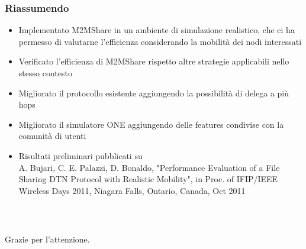\documentclass{beamer}
\begin{document}
%

\begin{frame}
\frametitle{Riassumendo}
\label{Riassumendo}
\begin{itemize}
\item Implementato M2MShare in un ambiente di simulazione realistico, che ci ha permesso di valutarne l'efficienza considerando la mobilità dei nodi interessati
\pause
\item Verificato l'efficienza di M2MShare rispetto altre strategie applicabili nello stesso contesto
\pause
\item Migliorato il protocollo esistente aggiungendo la possibilità di delega a più hops
\pause
\item Migliorato il simulatore ONE aggiungendo delle features condivise con la comunità di utenti
\pause
\item Risultati preliminari pubblicati su\\
A. Bujari, C. E. Palazzi, D. Bonaldo, "Performance Evaluation of a File Sharing DTN Protocol with Realistic Mobility", in Proc. of IFIP/IEEE Wireless Days 2011, Niagara
Falls, Ontario, Canada, Oct 2011
\end{itemize}
\end{frame}

\begin{frame}
\frametitle{\ }
\begin{center}
Grazie per l'attenzione.
\end{center}
\end{frame}
\end{document}
